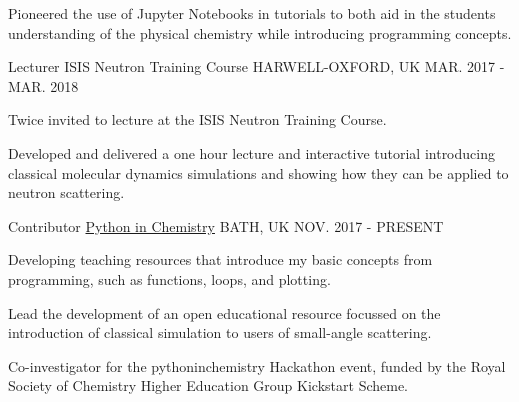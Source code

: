 \begin{cventries}
{\begin{cvitems}
			\item {Pioneered the use of Jupyter Notebooks in tutorials to both aid in the students understanding of the physical chemistry while introducing programming concepts.}
		\end{cvitems}
	}
	\cventry
	{Lecturer}
	{ISIS Neutron Training Course}
	{HARWELL-OXFORD, UK}
	{MAR. 2017 - MAR. 2018}
	{
		\begin{cvitems}
			\item {Twice invited to lecture at the ISIS Neutron Training Course.}
			\item {Developed and delivered a one hour lecture and interactive tutorial introducing classical molecular dynamics simulations and showing how they can be applied to neutron scattering.}
		\end{cvitems}
	}
	\cventry
	{Contributor}
	{\href{https://pythoninchemistry.org}{Python in Chemistry}}
	{BATH, UK}
	{NOV. 2017 - PRESENT}
	{
		\begin{cvitems}
			\item {Developing teaching resources that introduce my basic concepts from programming, such as functions, loops, and plotting.}
			\item {Lead the development of an open educational resource focussed on the introduction of classical simulation to users of small-angle scattering.}
			\item {Co-investigator for the pythoninchemistry Hackathon event, funded by the Royal Society of Chemistry Higher Education Group Kickstart Scheme.}
		\end{cvitems}
	}
\end{cventries}
